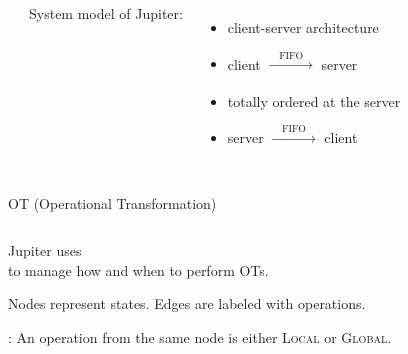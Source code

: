 
\begin{frame}{}
  \centerline{\Huge {}}
\end{frame}

\begin{frame}{}
  \begin{columns}
      \begin{center}
	
      \end{center}
      System model of Jupiter: \\[5pt]
      \begin{itemize}
	\setlength{\itemsep}{10pt}
	\item<1-> client-server architecture
	\item<2-> client $\xrightarrow[]{\quad \text{FIFO} \quad}$ server
	\item<3-> totally ordered at the server
	\item<4-> server $\xrightarrow[]{\quad \text{FIFO} \quad}$ client
      \end{itemize}
  \end{columns}
\end{frame}

\begin{frame}{}
  \centerline{OT (Operational Transformation)~\cite{}}

  \begin{columns}[c]
      \begin{center}
	
      \end{center}
  \end{columns}
\end{frame}

\begin{frame}{}
  \begin{center}
    {\large Jupiter uses ~\cite{} \\
    to manage how and when to perform OTs.}
  \end{center}


  \begin{center} 
    \pause
    Nodes represent states. \quad Edges are labeled with operations.

    \pause
    : An operation from the same node is either \textsc{Local} or \textsc{Global}. 
  \end{center}
\end{frame}

